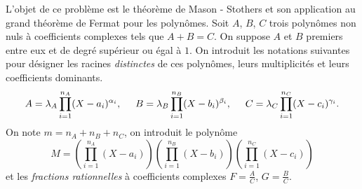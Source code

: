 L'objet de ce problème est le théorème de  Mason - Stothers et son application au grand théorème de Fermat pour les polynômes.\newline
Soit $A$, $B$, $C$ trois polynômes non nuls à coefficients complexes tels que $A+B=C$. On suppose $A$ et $B$ premiers entre eux et de degré supérieur ou égal à $1$.\newline
On introduit les notations suivantes pour désigner les racines \emph{distinctes} de ces polynômes, leurs multiplicités et leurs coefficients dominants.
\begin{displaymath}
 A=\lambda_A\prod_{i=1}^{n_A}(X-a_i)^{\alpha_i},\hspace{0.5cm}
 B=\lambda_B\prod_{i=1}^{n_B}(X-b_i)^{\beta_i},\hspace{0.5cm}
 C=\lambda_C\prod_{i=1}^{n_C}(X-c_i)^{\gamma_i}.
\end{displaymath}
On note $m= n_A + n_B + n_C$, on introduit le polynôme
\begin{displaymath}
 M = \left( \prod_{i=1}^{n_A}(X-a_i)\right) \left( \prod_{i=1}^{n_B}(X-b_i)\right) \left( \prod_{i=1}^{n_C}(X-c_i)\right) 
\end{displaymath}
et les \emph{fractions rationnelles} à coefficients complexes $F=\frac{A}{C}$, $G=\frac{B}{C}$.
